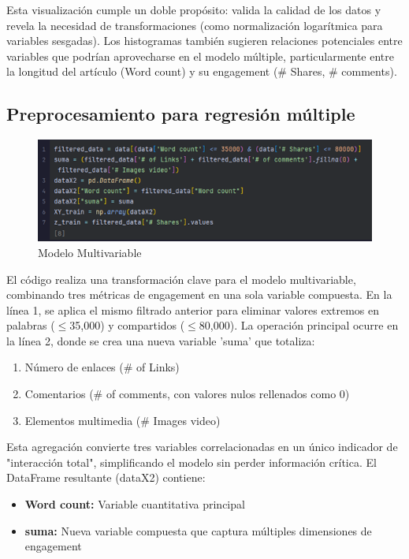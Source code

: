 \documentclass[12pt, a4paper]{article}
\begin{document}
Esta visualización cumple un doble propósito: valida la calidad de los datos y revela la necesidad de transformaciones (como normalización logarítmica para variables sesgadas). Los histogramas también sugieren relaciones potenciales entre variables que podrían aprovecharse en el modelo múltiple, particularmente entre la longitud del artículo (Word count) y su engagement (\# Shares, \# comments).

\subsection{Preprocesamiento para regresión múltiple}

\begin{figure}[H]
    \centering
    \includegraphics[width=1.0\textwidth]{Actividad-10/Imagen3.png}
    \caption{Modelo Multivariable}
\end{figure}

El código realiza una transformación clave para el modelo multivariable, combinando tres métricas de engagement en una sola variable compuesta. En la línea 1, se aplica el mismo filtrado anterior para eliminar valores extremos en palabras ($\leq$35,000) y compartidos ($\leq$80,000). La operación principal ocurre en la línea 2, donde se crea una nueva variable 'suma' que totaliza:

\begin{enumerate}
    \item Número de enlaces (\# of Links)
    \item Comentarios (\# of comments, con valores nulos rellenados como 0)
    \item Elementos multimedia (\# Images video)
\end{enumerate}

Esta agregación convierte tres variables correlacionadas en un único indicador de "interacción total", simplificando el modelo sin perder información crítica. El DataFrame resultante (dataX2) contiene:

\begin{itemize}
    \item\textbf{Word count:} Variable cuantitativa principal
    \item\textbf{suma:} Nueva variable compuesta que captura múltiples dimensiones de engagement
\end{itemize}
\end{document}
